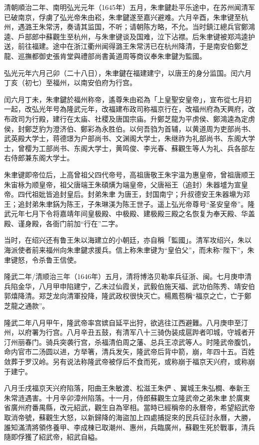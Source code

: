 清朝順治二年、南明弘光元年（1645年）五月，朱聿鍵赴平乐途中，在苏州闻清军已破南京，俘虜了弘光帝朱由崧，朱聿鍵遂至嘉兴避难。六月辛酉，朱聿键至杭州，遇潞王朱常淓，奏请其监国，不听；请朝陈方略，不允。当时鎮江總兵官鄭鴻逵、戶部郎中蘇觀生至杭州，与朱聿键谈及国难，泣下沾襟。后朱聿键被郑鸿逵护送，前往福建。途中在浙江衢州闻得潞王朱常淓已在杭州降清，于是南安伯鄭芝龍、巡撫都御史張肯堂與禮部尚書黃道周等商议奉朱聿鍵为監國。

弘光元年六月己卯（二十八日），朱聿鍵在福建建宁，以唐王的身分监国。闰六月丁亥（初七）至福州，以南安伯府为行宫。

闰六月丁未，朱聿鍵於福州称帝，遙尊朱由崧為「上皇聖安皇帝」，宣布從七月初一起，改弘光年号為隆武元年，改福建布政司称福京行在，改福州府為天興府，改布政司为行殿，建行在太庙、社稷及唐国宗庙。升鄭芝龍为平虏侯、鄭鴻逵為定虏侯，封鄭芝豹为澄济伯、鄭彩為永胜伯。以何吾驺为首辅，以黄道周为吏部尚书、武英殿大学士，蒋德璟为户部尚书、文渊阁大学士，朱继祚为礼部尚书、东阁大学士，曾樱为工部尚书、东阁大学士，黄鸣俊、李光春、蘇觀生等人为礼、兵各部左右侍郎兼东阁大学士。

朱聿键即帝位后，上高曾祖父四代帝号，高祖唐敬王朱宇温为惠皇帝，曾祖唐顺王朱宙栐为顺皇帝，祖父唐端王朱碩熿为端皇帝，父唐裕王（追封）朱器墭为宣皇帝。四代祖妣皆追封皇后。封弟朱聿𨮁为唐王，封国南宁；升叔德安王朱器䵺为邓王；追封弟朱聿𨧨为陈王，子朱琳渼为陈王世子。遥上弘光帝尊号“圣安皇帝”。隆武元年七月下令将嘉靖年间皇极殿、中极殿、建极殿三殿之名恢复为奉天殿、华盖殿、谨身殿，各衙门前加“行在”二字。

当时，在绍兴还有鲁王朱以海建立的小朝廷，亦自稱「監國」。清军攻绍兴，朱以海派使者前来福州向朱聿鍵求援兵。信上称朱聿键为“皇伯父”，而未称“陛下”，朱聿键怒，令杀鲁王信使。

隆武二年/清顺治三年（1646年）五月，清将博洛贝勒率兵征浙、闽。七月庚申清兵陷金华，八月甲申陷建宁，乙未过仙霞关，武毅伯施天福、武功伯陈秀、靖安伯郭熺降清。郑芝龙向清軍投降，隆武政权很快灭亡。楊鳳苞稱“福京之亡，亡于鄭芝龍之通款”。

隆武二年八月甲午，隆武帝率宫嫔自延平出狩，欲逃往江西避難。八月庚申至汀州，以府署为行宫。八月辛丑五鼓，有清军八十三骑伪装成扈跸者叩城，守城者开汀州丽春门。骑兵突袭行宫，杀福清伯周之藩、总兵王凉武等人。时隆武帝腹饥，命内官市二汤圆以进，方举箸，清兵发矢，隆武帝后背中箭，崩，年四十五。百姓敛葬于罗汉岭。另有说法称隆武帝被俘后不食而死，或称崩于福京天兴府，或称崩于建宁。

八月壬戌福京天兴府陷落，阳曲王朱敏渡、松滋王朱俨𨫃、翼城王朱弘橺、奉新王朱常涟遇害。十月辛卯漳州陷落。十一月，侍郎蘇觀生立隆武帝之弟朱聿𨮁於廣東省廣州府番禺縣，改元紹武，觀生自為宰相。當時已經稱帝的永曆帝，希望紹武帝取消帝號，蘇觀生大怒，以新歸降的海盜加上四處捕捉來的民兵征討永曆，大勝，誰知滿清將領佟養甲、李成棟已取潮州、惠州，兵臨廣州，蘇觀生死於戰事，清兵隨即俘獲了紹武帝，紹武自縊。

